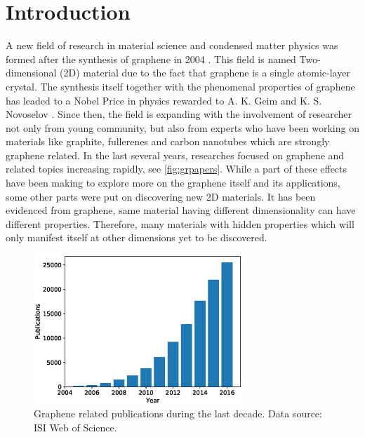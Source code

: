 
\chapter{Introduction \label{chap:1}}  %

\ifpdf
    \graphicspath{{Chapter1/Figs/Raster/}{Chapter1/Figs/PDF/}{Chapter1/Figs/}{Chapter1/Figs/Vector/}}
\else
    \graphicspath{{Chapter1/Figs/Vector/}{Chapter1/Figs/}}
\fi



A new field of research in material science and condensed matter physics was formed after the synthesis of graphene in 2004 \cite{Novoselov666,Novoselov26072005}. This field is named Two-dimensional (2D) material due to the fact that graphene is a single atomic-layer crystal. The synthesis itself together with the phenomenal properties of graphene has leaded to a Nobel Price in physics rewarded to A. K. Geim and K. S. Novoselov \cite{Geim2007}. Since then, the field is expanding with the involvement of researcher not only from young community, but also from experts who have been working on materials like graphite, fullerenes and carbon nanotubes which are strongly graphene related. In the last several years, researches focused on graphene and related topics increasing rapidly, see \autoref{fig:grpapers}. While a part of these effects have been making to explore more on the graphene itself and its applications, some other parts were put on discovering new 2D materials. It has been evidenced from graphene, same material having different dimensionality can have different properties. Therefore, many materials with hidden properties which will only manifest itself at other dimensions yet to be discovered. 


\begin{figure}[htbp!] 
\centering  
\includegraphics[width=0.7\textwidth]{graphene_papers.eps}
\caption[Graphene publications]{Graphene related publications during the last decade. Data source: ISI Web of Science. \protect\footnotemark }  
\label{fig:grpapers}
\end{figure} 

